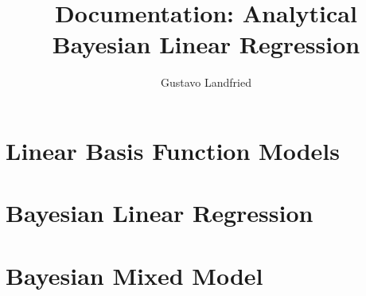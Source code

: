 \documentclass[a4paper,10pt]{article}
\title{Documentation: Analytical Bayesian Linear Regression}
\author{Gustavo Landfried}
\begin{document}
\maketitle

\section{Linear Basis Function Models}



\section{Bayesian Linear Regression}



\section{Bayesian Mixed Model}



 {\footnotesize
 
 
 }
\end{document}
